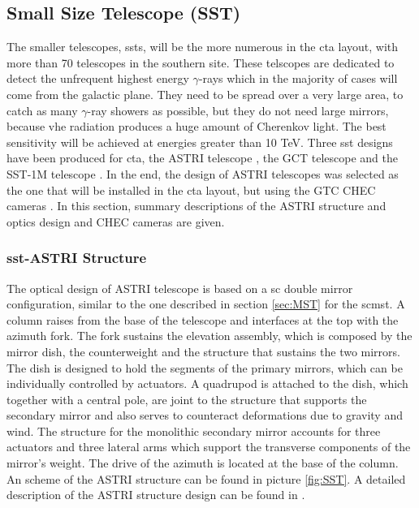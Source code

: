 \documentclass[main.tex]{subfiles}
\begin{document}
\subsection{Small Size Telescope (SST)}

The smaller telescopes, \glspl{sst}, will be the more numerous in the \gls{cta} layout, with more than 70 telescopes in the southern site. These telscopes are dedicated to detect the unfrequent highest energy $\gamma$-rays which in the majority of cases will come from the galactic plane. They need to be spread over a very large area, to catch as many $\gamma$-ray showers as possible, but they do not need large mirrors, because \gls{vhe} radiation produces a huge amount of Cherenkov light. The best sensitivity will be achieved at energies greater than 10 TeV. Three \gls{sst} designs have been produced  for \gls{cta}, the ASTRI telescope \cite{2017ASTRItels}, the GCT telescope \cite{2017CHECtels} and the SST-1M telescope \cite{2017SST1M}. In the end, the design of ASTRI telescopes was selected as the one that will be installed in the \gls{cta} layout, but using the GTC CHEC cameras \cite{2017CHECcam}. In this section, summary descriptions of the ASTRI structure and optics design and CHEC cameras are given.

\subsubsection{\gls{sst}-ASTRI Structure}

The optical design of ASTRI telescope is based on a \gls{sc} double mirror configuration, similar to the one described in section \ref{sec:MST} for the \gls{scmst}. A column raises from the base of the telescope and interfaces at the top with the azimuth fork. The fork sustains the elevation assembly, which is composed by the mirror dish, the counterweight and the structure that sustains the two mirrors. The dish is designed to hold the segments of the primary mirrors, which can be individually controlled by actuators. A quadrupod is attached to the dish, which together with a central pole, are joint to the structure that supports the secondary mirror and also serves to counteract deformations due to gravity and wind. The structure for the monolithic secondary mirror accounts for three actuators and three lateral arms which support the transverse components of the mirror's weight. The drive of the azimuth is located at the base of the column. An scheme of the ASTRI structure can be found in picture \ref{fig:SST}. A detailed description of the ASTRI structure design can be found in \cite{2013SSTstruct}.
\end{document}
